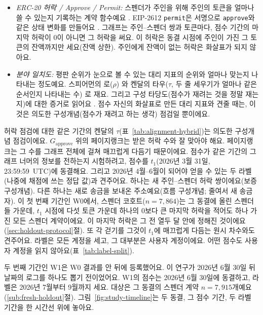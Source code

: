 \begin{itemize}
\item \emph{ERC-20 허락 / Approve / Permit:} 스펜더가 주인을 위해 주인의 토큰을 얼마나 쓸 수 있는지 기록하는 계약 함수예요 \parencite{vogelsteller2015erc20}. EIP-2612 \texttt{permit}은 서명으로 \texttt{approve}와 같은 상태 변화를 만들어요 \parencite{lundfall2020permit}. 그래프는 주인--스펜더 쌍과 토큰마다, 점수 기간의 마지막 허락이 0이 아니면 그 허락을 써요. 이 허락은 동결 시점에 주인이 가진 그 토큰의 잔액까지만 세요(잔액 상한). 주인에게 잔액이 없는 허락은 화살표가 되지 않아요.
\item \emph{분야 일치도:} 평판 순위가 눈으로 볼 수 있는 대리 지표의 순위와 얼마나 맞는지 나타내는 정도예요. 스피어먼의 로($\rho$) \parencite{spearman1904proof}와 켄달의 타우($\tau$, 두 줄 세우기가 얼마나 같은 순서인지 나타내는 수) \parencite{kendall1938rank}로 재요. 그리고 구성 타당도(점수가 재려는 것을 정말 재는지)에 대한 증거로 읽어요 \parencite{cronbach1955construct}. 점수 자신의 화살표로 만든 대리 지표와 견줄 때는, 이것은 의도한 구성개념(점수가 재려고 하는 생각) 점검일 뿐이에요.
\end{itemize}


허락 점검에 대한 같은 기간의 켄달의 $\tau$(표~\ref{tab:alignment-hybrid})는 의도한 구성개념 점검이에요. $G_{\text{approve}}$ 위의 페이지랭크는 받은 허락 수와 잘 맞아야 해요. 페이지랭크는 그 수를 그래프 전체에 걸쳐 매끄럽게 다듬기 때문이에요. 점수가 같은 기간의 그래프 너머의 정보를 전하는지 시험하려고, 점수를 $t_1$(2026년 3월 31일, 23:59:59~UTC)에 동결해요. 그리고 2026년 4월--6월이 되어야 얻을 수 있는 두 라벨(나중에 채점에 쓰는 정답 값)과 견주어요. 하나는 새 주인--스펜더 허락 쌍이에요(보증 구성개념). 다른 하나는 새로 송금을 보내온 주소예요(흐름 구성개념; 줄여서 새 송금자). 이 첫 번째 기간인 W0에서, 스펜더 코호트($n=7{,}864$)는 그 동결에 올린 스펜더들 가운데, $t_1$ 시점에 다섯 토큰 가운데 하나의 0보다 큰 마지막 허락을 적어도 하나 가진 모든 스펜더 계약이에요. 이 마지막 허락은 그 전 열두 달 안에 정해진 것이에요(\ref{sec:holdout-protocol}절). 또 각 걷기를 그것이 $t_1$에 매끄럽게 다듬는 원시 차수와도 견주어요. 라벨은 모든 계정을 세고, 그 대부분은 사용자 계정이에요. 어떤 점수도 사용자 계정을 읽지 않아요(표~\ref{tab:label-split}).

두 번째 기간인 W1은 W0 결과를 안 뒤에 등록했어요. 이 연구가 2026년 6월 30일 뒤 날짜의 로그를 하나도 뽑기 전이었어요. W1의 점수는 2026년 6월 30일에 동결하고, 라벨은 2026년 7월부터 9월까지 세요. 대상은 그 동결의 스펜더 계약 $n=7{,}915$개예요(\ref{sub:fresh-holdout}절). 그림~\ref{fig:study-timeline}는 두 동결, 그 점수 기간, 두 라벨 기간을 한 시간선 위에 놓아요.

